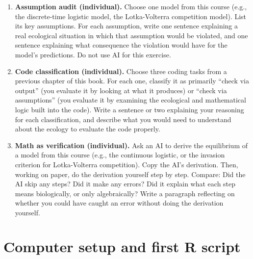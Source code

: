 \documentclass[
  letterpaper,
  DIV=11,
  numbers=noendperiod]{scrreprt}
\providecommand{\tightlist}{%
  \setlength{\itemsep}{0pt}\setlength{\parskip}{0pt}}
\begin{document}
\begin{enumerate}
  \begin{enumerate}
  \def\labelenumii{\alph{enumii}.}
  \tightlist
  \item
    What did the AI get right?
  \item
    What did it get wrong, or what important nuance did it miss?
  \item
    What assumptions or caveats were absent from the AI's explanation?
  \item
    Would a student who read only the AI's response develop a correct
    understanding of the concept? Why or why not?
  \end{enumerate}
\item
  \textbf{Assumption audit (individual).} Choose one model from this
  course (e.g., the discrete-time logistic model, the Lotka-Volterra
  competition model). List its key assumptions. For each assumption,
  write one sentence explaining a real ecological situation in which
  that assumption would be violated, and one sentence explaining what
  consequence the violation would have for the model's predictions. Do
  not use AI for this exercise.
\item
  \textbf{Code classification (individual).} Choose three coding tasks
  from a previous chapter of this book. For each one, classify it as
  primarily ``check via output'' (you evaluate it by looking at what it
  produces) or ``check via assumptions'' (you evaluate it by examining
  the ecological and mathematical logic built into the code). Write a
  sentence or two explaining your reasoning for each classification, and
  describe what you would need to understand about the ecology to
  evaluate the code properly.
\item
  \textbf{Math as verification (individual).} Ask an AI to derive the
  equilibrium of a model from this course (e.g., the continuous
  logistic, or the invasion criterion for Lotka-Volterra competition).
  Copy the AI's derivation. Then, working on paper, do the derivation
  yourself step by step. Compare: Did the AI skip any steps? Did it make
  any errors? Did it explain what each step means biologically, or only
  algebraically? Write a paragraph reflecting on whether you could have
  caught an error without doing the derivation yourself.
\end{enumerate}


\chapter{Computer setup and first R
script}\label{computer-setup-and-first-r-script}
\end{document}
